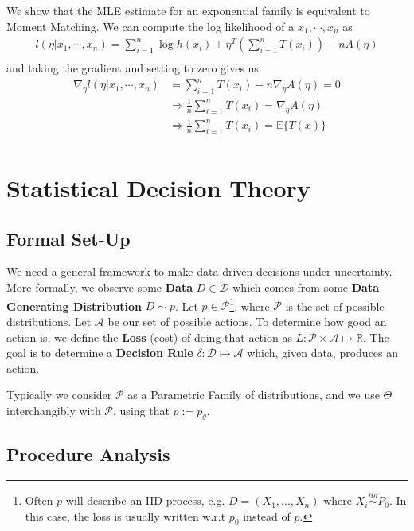 \documentclass[]{article}
\theoremstyle{mattstyle}
\theoremstyle{definition}
\begin{document}
We show that the MLE estimate for an exponential family is equivalent to Moment Matching. We can compute the log likelihood of a $x_1, \cdots, x_n$ as
\begin{align*}
l(\eta| x_1, \cdots, x_n) = \sum_{i=1}^n \log h(x_i) +  \eta^T\left(\sum_{i=1}^nT(x_i)\right) - nA(\eta)\\
\end{align*}
and taking the gradient and setting to zero gives us:
\begin{align*}
\nabla_{\eta} l(\eta| x_1, \cdots, x_n) &= \sum_{i=1}^nT(x_i) - n\nabla_{\eta} A(\eta) = 0\\
&\Rightarrow \frac{1}{n}\sum_{i=1}^nT(x_i) = \nabla_{\eta}A(\eta)\\
&\Rightarrow \frac{1}{n}\sum_{i=1}^nT(x_i) = \mathbb{E}\{T(x)\}\\
\end{align*}

\newpage

\section{Statistical Decision Theory}

\subsection{Formal Set-Up}

We need a general framework to make data-driven decisions under uncertainty. More formally, we observe some \textbf{Data} \(D \in \mathcal{D}\) which comes from some \textbf{Data Generating Distribution} \(D \sim p\). Let \(p\in \mathcal{P}\)\footnote{Often $p$ will describe an IID process, e.g. $D = (X_1,...,X_n)$ where $X_i \overset{iid}\sim P_0$. In this case, the loss is usually written w.r.t $p_0$ instead of $p$.}, where \(\mathcal{P}\) is the set of possible distributions. Let \(\mathcal{A}\) be our set of possible actions. To determine how good an action is, we define the \textbf{Loss} (cost) of doing that action as \(L: \mathcal{P} \times \mathcal{A} \mapsto \mathbb{R}\). The goal is to determine a \textbf{Decision Rule} \(\delta: \mathcal{D} \mapsto \mathcal{A}\) which, given data, produces an action.

Typically we consider \(\mathcal{P}\) as a Parametric Family of distributions, and we use \(\Theta\) interchangibly with \(\mathcal{P}\), using that \(p := p_{\theta}\).

\subsection{Procedure Analysis}
\end{document}
